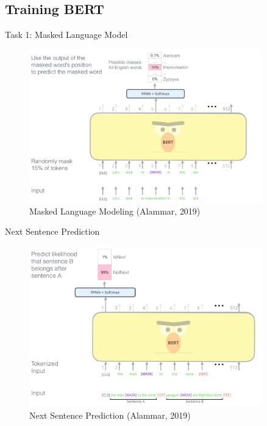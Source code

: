 \documentclass[10pt]{beamer}
\begin{document}
\subsection{Training BERT}


\begin{frame}{Task 1: Masked Language Model}

\begin{figure}[h]
\centering
\includegraphics[width=0.9\textwidth]{fig/BERT-language-modeling-masked-lm.png}
\caption{Masked Language Modeling (Alammar, 2019)}
\end{figure}

\end{frame}


\begin{frame}{Next Sentence Prediction}

\begin{figure}[h]
\centering
\includegraphics[width=0.9\textwidth]{fig/bert-next-sentence-prediction.png}
\caption{Next Sentence Prediction (Alammar, 2019)}
\end{figure}

\end{frame}
\end{document}
